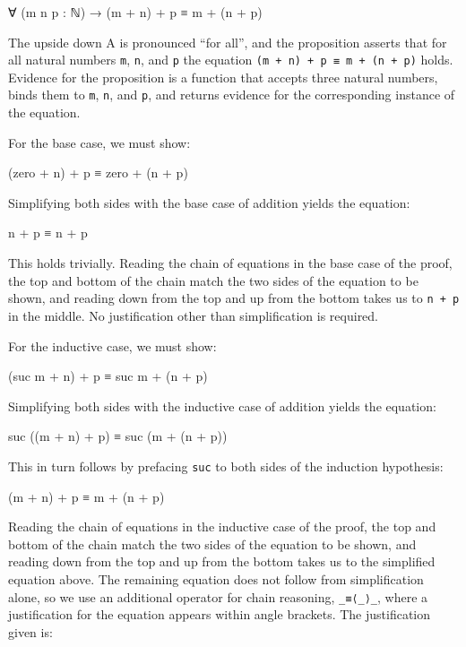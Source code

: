 \begin{myDisplay}
∀ (m n p : ℕ) → (m + n) + p ≡ m + (n + p)
\end{myDisplay}

The upside down A is pronounced ``for all'', and the proposition asserts
that for all natural numbers \texttt{m}, \texttt{n}, and \texttt{p} the
equation \texttt{(m\ +\ n)\ +\ p\ ≡\ m\ +\ (n\ +\ p)} holds. Evidence
for the proposition is a function that accepts three natural numbers,
binds them to \texttt{m}, \texttt{n}, and \texttt{p}, and returns
evidence for the corresponding instance of the equation.

For the base case, we must show:

\begin{myDisplay}
(zero + n) + p ≡ zero + (n + p)
\end{myDisplay}

Simplifying both sides with the base case of addition yields the
equation:

\begin{myDisplay}
n + p ≡ n + p
\end{myDisplay}

This holds trivially. Reading the chain of equations in the base case of
the proof, the top and bottom of the chain match the two sides of the
equation to be shown, and reading down from the top and up from the
bottom takes us to \texttt{n\ +\ p} in the middle. No justification
other than simplification is required.

For the inductive case, we must show:

\begin{myDisplay}
(suc m + n) + p ≡ suc m + (n + p)
\end{myDisplay}

Simplifying both sides with the inductive case of addition yields the
equation:

\begin{myDisplay}
suc ((m + n) + p) ≡ suc (m + (n + p))
\end{myDisplay}

This in turn follows by prefacing \texttt{suc} to both sides of the
induction hypothesis:

\begin{myDisplay}
(m + n) + p ≡ m + (n + p)
\end{myDisplay}

Reading the chain of equations in the inductive case of the proof, the
top and bottom of the chain match the two sides of the equation to be
shown, and reading down from the top and up from the bottom takes us to
the simplified equation above. The remaining equation does not follow
from simplification alone, so we use an additional operator for chain
reasoning, \texttt{\_≡⟨\_⟩\_}, where a justification for the equation
appears within angle brackets. The justification given is:

